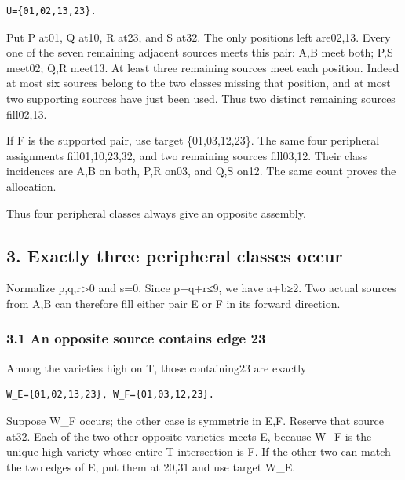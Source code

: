 \documentclass[
  10pt,
]{article}
\begin{document}
\begin{verbatim}
U={01,02,13,23}.
\end{verbatim}

Put P at01, Q at10, R at23, and S at32. The only positions left
are02,13. Every one of the seven remaining adjacent sources meets this
pair: A,B meet both; P,S meet02; Q,R meet13. At least three remaining
sources meet each position. Indeed at most six sources belong to the two
classes missing that position, and at most two supporting sources have
just been used. Thus two distinct remaining sources fill02,13.

If F is the supported pair, use target \{01,03,12,23\}. The same four
peripheral assignments fill01,10,23,32, and two remaining sources
fill03,12. Their class incidences are A,B on both, P,R on03, and Q,S
on12. The same count proves the allocation.

Thus four peripheral classes always give an opposite assembly.

\hypertarget{exactly-three-peripheral-classes-occur}{%
\subsection*{3. Exactly three peripheral classes
occur}\label{exactly-three-peripheral-classes-occur}}

Normalize p,q,r\textgreater0 and s=0. Since p+q+r≤9, we have a+b≥2. Two
actual sources from A,B can therefore fill either pair E or F in its
forward direction.

\hypertarget{an-opposite-source-contains-edge-23}{%
\subsubsection*{3.1 An opposite source contains edge
23}\label{an-opposite-source-contains-edge-23}}

Among the varieties high on T, those containing23 are exactly

\begin{verbatim}
W_E={01,02,13,23}, W_F={01,03,12,23}.
\end{verbatim}

Suppose W\_F occurs; the other case is symmetric in E,F. Reserve that
source at32. Each of the two other opposite varieties meets E, because
W\_F is the unique high variety whose entire T-intersection is F. If the
other two can match the two edges of E, put them at 20,31 and use target
W\_E.
\end{document}
